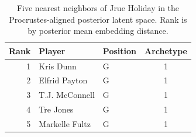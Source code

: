 \begin{table}[htbp]
  \centering\small
  \begin{tabular}{rllc}
    \toprule
    Rank & Player & Position & Archetype \\
    \midrule
    1 & Kris Dunn & G & 1 \\
    2 & Elfrid Payton & G & 1 \\
    3 & T.J. McConnell & G & 1 \\
    4 & Tre Jones & G & 1 \\
    5 & Markelle Fultz & G & 1 \\
    \bottomrule
  \end{tabular}
  \caption{Five nearest neighbors of Jrue Holiday in the Procrustes-aligned posterior latent space. Rank is by posterior mean embedding distance.}
  \label{tab:Jrue_Holiday_neighbors}
\end{table}

